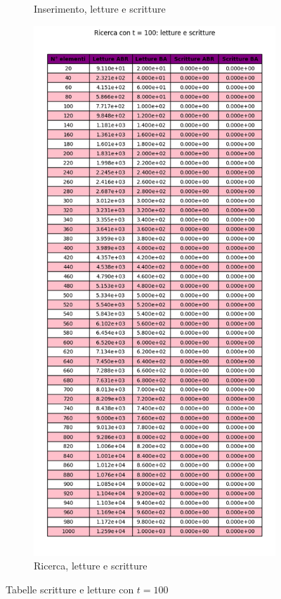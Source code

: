 \begin{figure}[H]
\begin{subfigure}[b]{0.49\textwidth}
        \caption{Inserimento, letture e scritture}
        \label{fig:tableinsertwr100}
    \end{subfigure}
    \hfill
    \begin{subfigure}[b]{0.49\textwidth}
        \centering
        \includegraphics[width=\textwidth]{tables/search-wr-t100.png}
        \caption{Ricerca, letture e scritture}
        \label{fig:tablesearchwr100}
    \end{subfigure}
    \caption{Tabelle scritture e letture con $t=100$}
    \label{fig:tablewr100}
\end{figure}


